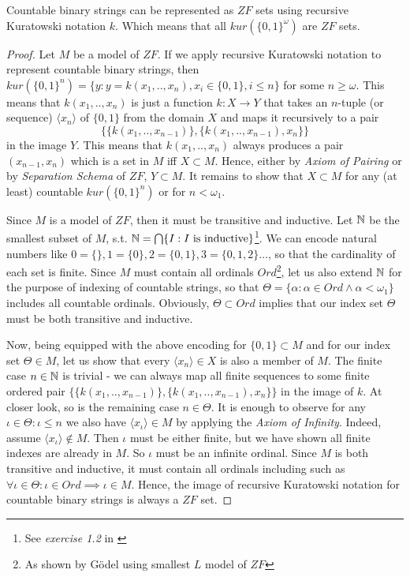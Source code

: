 \begin{lemma}\label{lemma_str_kur_zf} 
    Countable binary strings can be represented as $ZF$ sets using recursive Kuratowski notation $k$. Which means that all $kur(\{0,1\}^\omega)$ are $ZF$ sets.
\end{lemma}
\begin{proof}
    Let $M$ be a model of $ZF$. If we apply recursive Kuratowski notation to represent countable binary strings, then $kur(\{0,1\}^n) = \{y : y = k(x_1,..,x_n), x_i \in \{0, 1\}, i \leq n \}$ for some $n \geq \omega$. This means that $k(x_1,..,x_n)$ is just a function $k: X \to Y$ that takes an $n$-tuple (or sequence) $\langle x_n \rangle$ of $\{0, 1\}$ from the domain $X$ and maps it recursively to a pair 
        \[ \big\{\{k(x_1,..,x_{n-1})\}, \{k(x_1,..,x_{n-1}), x_n\}\big\} \] 
    in the image $Y$. This means that $k(x_1,..,x_n)$ always produces a pair $(x_{n-1}, x_n)$ which is a set in $M$ iff $X \subset M$. Hence, either by \textit{Axiom of Pairing} or by \textit{Separation Schema} of $ZF$, $Y \subset M$. It remains to show that $X \subset M$ for any (at least) countable $kur(\{0,1\}^n)$ or for $n < \omega_1$.

    Since $M$ is a model of $ZF$, then it must be transitive and inductive. Let $\mathbb{N}$ be the smallest subset of $M$, s.t. $\mathbb{N} = \bigcap \{I : I \text{ is inductive}\}$\footnote{See \textit{exercise 1.2} in \cite{jech2003set}}. We can encode natural numbers like $0 = \{\}, 1 = \{0\}, 2 = \{0, 1\}, 3 = \{0, 1, 2\} \dots$, so that the cardinality of each set is finite. Since $M$ must contain all ordinals $Ord$\footnote{As shown by Gödel using smallest $L$ model of $ZF$\cite{jech2003set}}, let us also extend $\mathbb{N}$ for the purpose of indexing of countable strings, so that $\Theta = \{ \alpha : \alpha \in Ord \land \alpha < \omega_1 \}$ includes all countable ordinals. Obviously, $\Theta \subset Ord$ implies that our index set $\Theta$ must be both transitive and inductive.
    
    Now, being equipped with the above encoding for $\{0, 1\} \subset M$ and for our index set $\Theta \in M$, let us show that every $\langle x_n \rangle \in X$ is also a member of $M$. The finite case $n \in \mathbb{N}$ is trivial - we can always map all finite sequences to some finite ordered pair $\big\{\{k(x_1,..,x_{n-1})\},\{k(x_1,..,x_{n-1}), x_n\}\big\}$ in the image of $k$. At closer look, so is the remaining case $n \in \Theta$. It is enough to observe for any $\iota \in \Theta: \iota \leq n$ we also have $\langle x_\iota \rangle \in M$ by applying the \textit{Axiom of Infinity}. Indeed, assume $\langle x_\iota \rangle \notin M$. Then $\iota$ must be either finite, but we have shown all finite indexes are already in $M$. So $\iota$ must be an infinite ordinal. Since $M$ is both transitive and inductive, it must contain all ordinals including such as $\forall \iota \in \Theta : \iota \in Ord \implies \iota \in M$. Hence, the image of recursive Kuratowski notation for countable binary strings is always a $ZF$ set.
\end{proof}

